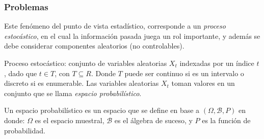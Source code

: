 \begin{frame}
\frametitle{Problemas}
Este fenómeno del punto de vista estadístico, corresponde a un \emph{proceso
estocástico}, en el cual la información pasada juega un rol importante, y
además se debe considerar componentes aleatorios (no controlables).

Proceso estocástico: conjunto de variables aleatorias $X_t$ indexadas por un
índice $t$, dado que $t \in T$, con $T \subseteq R$. Donde $T$ puede ser
continuo si es un intervalo o discreto si es enumerable. Las variables
aleatorias $X_t$ toman valores en un conjunto que se llama \emph{espacio
probabilístico}.

Un espacio probabilístico es un espacio que se define en base a $(\Omega,
\mathcal B, P)$ en donde: $\Omega$ es el espacio muestral, $\mathcal B$ es el
álgebra de suceso, y $P$ es la función de probabilidad.

\end{frame}
